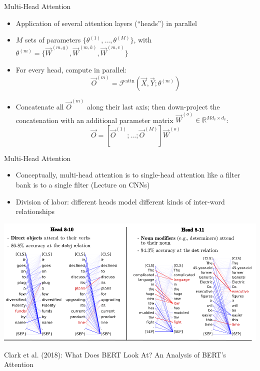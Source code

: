 \begin{vbframe}{Multi-Head Attention}

\vfill

\begin{itemize}
\item Application of several attention layers (``heads'') in parallel
\item $M$ sets of parameters $\{\theta^{(1)}, \ldots, \theta^{(M)}\}$, with $\theta^{(m)} = \{\vec {W}^{(m,q)}, \vec {W}^{(m,k)}, \vec {W}^{(m,v)}\}$
\item For every head, compute in parallel:
$$ \vec O^{(m)} = \mathcal{F}^\mathrm{attn}(\vec X, \vec Y; \theta^{(m)}) $$
\item Concatenate all $\vec {O}^{(m)}$ along their last axis; then down-project the concatenation with an additional parameter matrix $\vec W^{(o)} \in \mathbb{R}^{Md_v \times d_v}$:
$$ \vec O = [\vec O^{(1)}; \ldots;  \vec O^{(M)}] \vec W^{(o)}$$
\end{itemize}

\vfill

\end{vbframe}


\begin{vbframe}{Multi-Head Attention}

\vfill

\begin{itemize}
\item Conceptually, multi-head attention is to single-head attention like a filter bank is to a single filter (Lecture on CNNs)
\item Division of labor: different heads model different kinds of inter-word relationships
\end{itemize}
\begin{center}
\includegraphics[width=.9\textwidth]{figure/heads}

{\tiny Clark et al. (2018): What Does BERT Look At? An Analysis of BERT’s Attention}
\end{center}

\vfill

\end{vbframe}


\endlecture



\begin{vbframe}{}

\vfill



\vfill

\end{vbframe}
